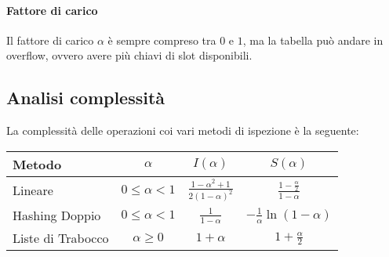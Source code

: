             \paragraph{Fattore di carico} Il fattore di carico $\alpha$ è sempre compreso tra $0$ e $1$, ma la tabella può andare in overflow, ovvero avere più chiavi di slot disponibili.
        \subsection{Analisi complessità}
            La complessità delle operazioni coi vari metodi di ispezione è la seguente:
            \begin{table}[H]
                \centering
                \begin{tabular}{l c c c}
                    \textbf{Metodo} & $\alpha$ & $I(\alpha)$ & $S(\alpha)$\\
                    \hline
                    Lineare & $0\leq \alpha < 1$ & $\frac{{1-\alpha}^2+1}{2(1-\alpha)^2}$ & $\frac{1-\frac{\alpha}2}{1-\alpha}$\\
                    Hashing Doppio & $0\leq \alpha < 1$ & $\frac{1}{1-\alpha}$ & $-\frac{1}{\alpha}\ln\left(1-\alpha\right)$\\
                    Liste di Trabocco & $\alpha\geq 0$ & $1+\alpha$ & $1+\frac{\alpha}2$
                \end{tabular}
            \end{table}